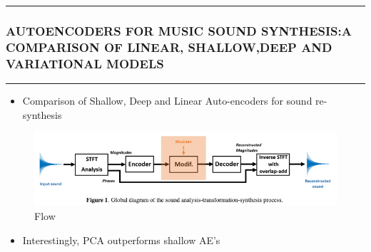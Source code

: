 \documentclass[11pt]{article}
\makeatletter
\def\maxwidth{\ifdim\Gin@nat@width>\linewidth\linewidth
    \else\Gin@nat@width\fi}
\let\Oldincludegraphics\includegraphics
\renewcommand{\includegraphics}[1]{\Oldincludegraphics[width=.8\maxwidth]{#1}}
\providecommand{\tightlist}{%
      \setlength{\itemsep}{0pt}\setlength{\parskip}{0pt}}
\makeatother
\begin{document}
    \begin{center}\rule{0.5\linewidth}{\linethickness}\end{center}

\subsubsection{AUTOENCODERS FOR MUSIC SOUND SYNTHESIS:A COMPARISON OF
LINEAR, SHALLOW,DEEP AND VARIATIONAL
MODELS}\label{autoencoders-for-music-sound-synthesisa-comparison-of-linear-shallowdeep-and-variational-models}

\begin{center}\rule{0.5\linewidth}{\linethickness}\end{center}

    \begin{itemize}
\tightlist
\item
  Comparison of Shallow, Deep and Linear Auto-encoders for sound
  re-synthesis
\end{itemize}

\begin{figure}
\centering
\includegraphics{fig_07.PNG}
\caption{Flow}
\end{figure}

\begin{itemize}
\tightlist
\item
  Interestingly, PCA outperforms shallow AE's
\end{itemize}
\end{document}
